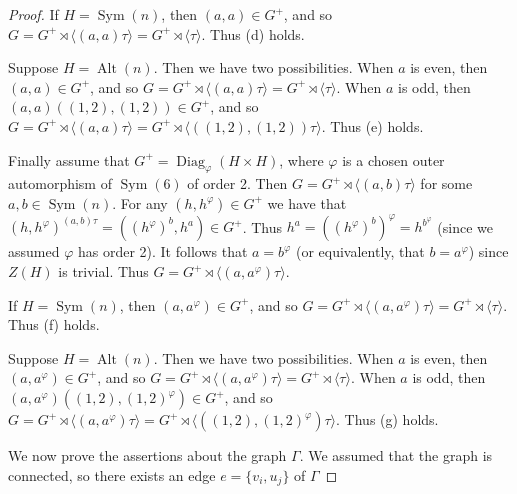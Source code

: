 \documentclass[11pt]{amsart}
\DeclareMathOperator{\Sym}{Sym}
\DeclareMathOperator{\Alt}{Alt}
\DeclareMathOperator{\Aut}{Aut}
\DeclareMathOperator{\Diag}{Diag}
\begin{document}
\begin{proof}
If $H=\Sym(n)$, then $(a,a)\in G^+$, and so  $G=G^+\rtimes \langle (a,a)\tau\rangle=G^+\rtimes \langle \tau\rangle$. Thus (d) holds.

Suppose  $H=\Alt(n)$. Then we have two possibilities.
When $a$ is even, then  $(a,a)\in G^+$, and so  $G=G^+\rtimes \langle (a,a)\tau\rangle=G^+\rtimes \langle\tau\rangle$. 
When $a$ is odd, then  $(a,a)((1,2),(1,2))\in G^+$, and so  $G=G^+\rtimes \langle (a,a)\tau\rangle=G^+\rtimes \langle((1,2),(1,2))\tau\rangle$. Thus (e) holds.



Finally assume that $G^+=\Diag_\varphi(H\times H)$, where $\varphi$ is a chosen outer automorphism of $\Sym(6)$ of order 2.
Then $G=G^+\rtimes \langle (a,b)\tau\rangle$ for some $a,b\in \Sym(n)$.
For any $(h,h^\varphi)\in G^+$ we have that $(h,h^\varphi)^{(a,b)\tau}=((h^\varphi)^b,h^a)\in G^+$. Thus $h^a=((h^\varphi)^b)^\varphi=h^{b^\varphi}$ (since we assumed $\varphi$ has order 2). It follows that $a=b^\varphi$ (or equivalently, that  $b=a^\varphi$) since $Z(H)$ is trivial.
Thus $G=G^+\rtimes \langle (a,a^\varphi)\tau\rangle$.

If $H=\Sym(n)$, then $(a,a^\varphi)\in G^+$, and so  $G=G^+\rtimes \langle (a,a^\varphi)\tau\rangle=G^+\rtimes \langle \tau\rangle$. Thus (f) holds.

Suppose  $H=\Alt(n)$. Then we have two possibilities.
When $a$ is even, then  $(a,a^\varphi)\in G^+$, and so  $G=G^+\rtimes \langle (a,a^\varphi)\tau\rangle=G^+\rtimes \langle\tau\rangle$. 
When $a$ is odd, then  $(a,a^\varphi)((1,2),(1,2)^\varphi)\in G^+$, and so  $G=G^+\rtimes \langle (a,a^\varphi)\tau\rangle=G^+\rtimes \langle((1,2),(1,2)^\varphi)\tau\rangle$. Thus (g) holds.

We now prove the assertions about the graph $\Gamma$. We assumed that the graph is connected, so there exists an edge $e=\{v_i,u_j\}$ of $\Gamma$


\end{proof}
\end{document}

